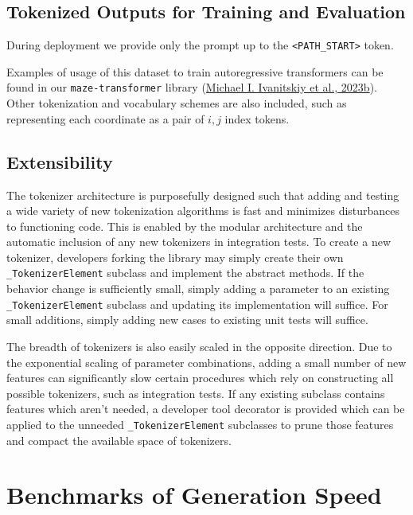 \documentclass[10pt,a4paper,onecolumn]{article}
\begin{document}
\hypertarget{token-training}{%
\subsection{Tokenized Outputs for Training and
Evaluation}\label{token-training}}

During deployment we provide only the prompt up to the
\texttt{\textless{}PATH\_START\textgreater{}} token.

Examples of usage of this dataset to train autoregressive transformers
can be found in our \texttt{maze-transformer} library
(\protect\hyperlink{ref-maze-transformer-github}{Michael I. Ivanitskiy
et al., 2023b}). Other tokenization and vocabulary schemes are also
included, such as representing each coordinate as a pair of \(i,j\)
index tokens.

\hypertarget{extensibility}{%
\subsection{Extensibility}\label{extensibility}}

The tokenizer architecture is purposefully designed such that adding and
testing a wide variety of new tokenization algorithms is fast and
minimizes disturbances to functioning code. This is enabled by the
modular architecture and the automatic inclusion of any new tokenizers
in integration tests. To create a new tokenizer, developers forking the
library may simply create their own \texttt{\_TokenizerElement} subclass
and implement the abstract methods. If the behavior change is
sufficiently small, simply adding a parameter to an existing
\texttt{\_TokenizerElement} subclass and updating its implementation
will suffice. For small additions, simply adding new cases to existing
unit tests will suffice.

The breadth of tokenizers is also easily scaled in the opposite
direction. Due to the exponential scaling of parameter combinations,
adding a small number of new features can significantly slow certain
procedures which rely on constructing all possible tokenizers, such as
integration tests. If any existing subclass contains features which
aren't needed, a developer tool decorator is provided which can be
applied to the unneeded \texttt{\_TokenizerElement} subclasses to prune
those features and compact the available space of tokenizers.

\hypertarget{benchmarks}{%
\section{Benchmarks of Generation Speed}\label{benchmarks}}
\end{document}
